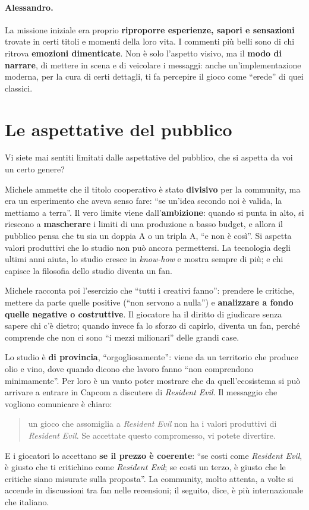 \paragraph{Alessandro.} La missione iniziale era proprio \textbf{riproporre
esperienze, sapori e sensazioni} trovate in certi titoli e momenti della loro
vita. I commenti più belli sono di chi ritrova \textbf{emozioni dimenticate}. Non
è solo l'aspetto visivo, ma il \textbf{modo di narrare}, di mettere in scena e di
veicolare i messaggi: anche un'implementazione moderna, per la cura di certi
dettagli, ti fa percepire il gioco come ``erede'' di quei classici.

\section{Le aspettative del pubblico}
\label{sec:c1-3-aspettative}

Vi siete mai sentiti limitati dalle aspettative del pubblico, che si aspetta da
voi un certo genere?

Michele ammette che il titolo cooperativo è stato \textbf{divisivo} per la
community, ma era un esperimento che aveva senso fare: ``se un'idea secondo noi è
valida, la mettiamo a terra''. Il vero limite viene dall'\textbf{ambizione}:
quando si punta in alto, si riescono a \textbf{mascherare} i limiti di una
produzione a basso budget, e allora il pubblico pensa che tu sia un doppia A o
un tripla A, ``e non è così''. Si aspetta valori produttivi che lo studio non può
ancora permettersi. La tecnologia degli ultimi anni aiuta, lo studio cresce in
\emph{know-how} e mostra sempre di più; e chi capisce la filosofia dello studio
diventa un fan.

Michele racconta poi l'esercizio che ``tutti i creativi fanno'': prendere le
critiche, mettere da parte quelle positive (``non servono a nulla'') e
\textbf{analizzare a fondo quelle negative o costruttive}. Il giocatore ha il
diritto di giudicare senza sapere chi c'è dietro; quando invece fa lo sforzo di
capirlo, diventa un fan, perché comprende che non ci sono ``i mezzi milionari''
delle grandi case.

Lo studio è \textbf{di provincia}, ``orgogliosamente'': viene da un territorio che
produce olio e vino, dove quando dicono che lavoro fanno ``non comprendono
minimamente''. Per loro è un vanto poter mostrare che da quell'ecosistema si può
arrivare a entrare in Capcom a discutere di \emph{Resident Evil}. Il messaggio
che vogliono comunicare è chiaro:
\begin{quote}
  un gioco che assomiglia a \emph{Resident Evil} non ha i valori produttivi di
  \emph{Resident Evil}. Se accettate questo compromesso, vi potete divertire.
\end{quote}
E i giocatori lo accettano \textbf{se il prezzo è coerente}: ``se costi come
\emph{Resident Evil}, è giusto che ti critichino come \emph{Resident Evil}; se
costi un terzo, è giusto che le critiche siano misurate sulla proposta''. La
community, molto attenta, a volte si accende in discussioni tra fan nelle
recensioni; il seguito, dice, è più internazionale che italiano.

